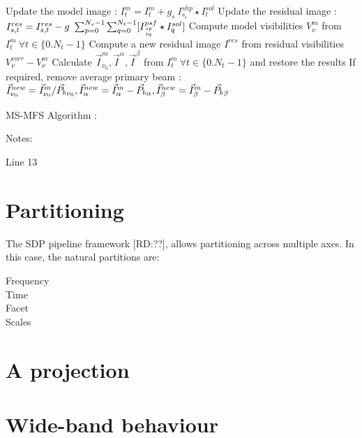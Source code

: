 \documentclass[11pt,a4paper]{article}
\begin{document}
\begin{algorithm}[t!]
{{{{      }
     }
       {
        Update the model image : $I^{m}_t = I^{m}_t + g_s ~ I^{shp}_{s_i} \star I^{sol}_t$ \;
	{
          Update the residual image : $I^{res}_{s,t} = I^{res}_{s,t} - g ~\sum_{p=0}^{N_s-1}\sum_{q=0}^{N_t-1}[I^{psf}_{{sp}\atop{tq}} \star I^{sol}_q]$\;
	}
       }
    }
   Compute model visibilities $V^{m}_{\nu}$ from  $I^{m}_t~\forall t\in \{0.N_t-1\}$ 
   Compute a new residual image $I^{res}$ from residual visibilities $V^{corr}_{\nu}-V^{m}_{\nu}$ 
}
Calculate $\vec{I}^m_{\nu_0}, \vec{I}^{\alpha}, \vec{I}^{\beta}$ from $I^{m}_t~\forall t\in \{0.N_t-1\}$ and restore the results \;
If required, remove average primary beam : $\vec{I}^{new}_{\nu_0}=\vec{I}^m_{\nu_0}/\vec{{P_b}}_{\nu_0}, \vec{I}^{new}_{\alpha}=\vec{I}^m_{\alpha}-\vec{{P_b}}_{\alpha}, \vec{I}^{new}_{\beta}=\vec{I}^m_{\beta}-\vec{{P_b}}_{\beta}$\;
\vspace{0.5cm}

  \caption[MS-MFS Algorithm]
          {MS-MFS Algorithm : }
\end{algorithm}

Notes:
\begin{description}
\item[Line 13]	
\end{description}


\clearpage
\section{Partitioning}
\label{sec:partitioning}

The SDP pipeline framework [RD:??], allows partitioning across multiple axes. In this case, the natural partitions are:

\begin{description}
\item[Frequency]
\item[Time]
\item[Facet]
\item[Scales]	
\end{description}


\clearpage
\section{A projection}
\label{sec:minor}

\clearpage
\section{Wide-band behaviour}
\label{sec:wideband}
\end{document}
